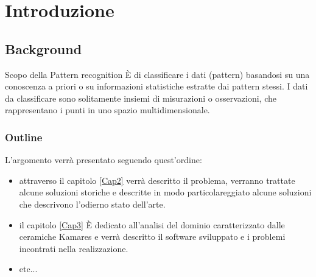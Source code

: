 \chapter{Introduzione} 
\label{Cap1}

\section{Background}
Scopo della Pattern recognition È di classificare i dati (pattern) basandosi su una conoscenza a priori o su informazioni statistiche estratte 
dai pattern stessi. I dati da classificare sono solitamente insiemi di misurazioni o osservazioni, che rappresentano i punti in uno spazio 
multidimensionale.
\subsection{Outline}
L'argomento verrà presentato seguendo quest'ordine:
\begin{itemize}
\item attraverso il capitolo \ref{Cap2} verrà descritto il problema, verranno trattate alcune soluzioni storiche e descritte in 
modo particolareggiato alcune soluzioni che descrivono l'odierno stato dell'arte.
\item il capitolo \ref{Cap3} È dedicato all'analisi del dominio caratterizzato dalle ceramiche Kamares e verrà descritto il software sviluppato
e i problemi incontrati nella realizzazione.
\item etc...
\end{itemize}